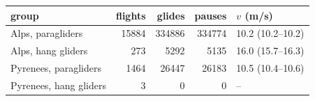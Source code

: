 \begin{tabular}{lrrrl}
\toprule
group & flights & glides & pauses & $v$ (m/s) \\
\midrule
Alps, paragliders & 15884 & 334886 & 334774 & 10.2 (10.2--10.2) \\
Alps, hang gliders & 273 & 5292 & 5135 & 16.0 (15.7--16.3) \\
Pyrenees, paragliders & 1464 & 26447 & 26183 & 10.5 (10.4--10.6) \\
Pyrenees, hang gliders & 3 & 0 & 0 & -- \\
\bottomrule
\end{tabular}
